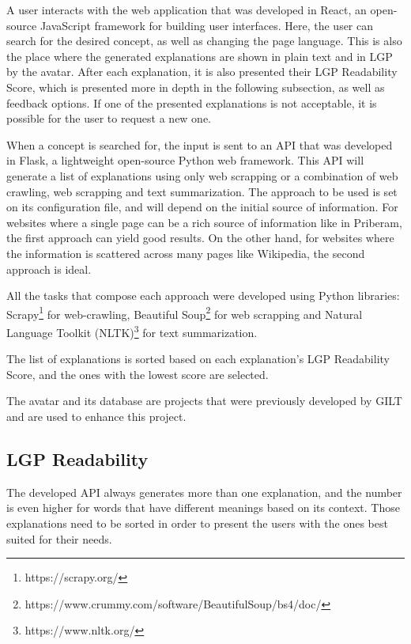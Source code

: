 \documentclass[runningheads]{llncs}
\begin{document}
A user interacts with the web application that was developed in React\cite{react}, an open-source JavaScript framework for building user interfaces.
Here, the user can search for the desired concept, as well as changing the page language.
This is also the place where the generated explanations are shown in plain text and in LGP by the avatar.
After each explanation, it is also presented their LGP Readability Score, which is presented more in depth in the following subsection, as well as feedback options.
If one of the presented explanations is not acceptable, it is possible for the user to request a new one.

When a concept is searched for, the input is sent to an API that was developed in Flask\cite{flask}, a lightweight open-source Python web framework.
This API will generate a list of explanations using only web scrapping or a combination of web crawling, web scrapping and text summarization.
The approach to be used is set on its configuration file, and will depend on the initial source of information.
For websites where a single page can be a rich source of information like in Priberam\cite{priberam}, the first approach can yield good results.
On the other hand, for websites where the information is scattered across many pages like Wikipedia\cite{wikipedia}, the second approach is ideal.

All the tasks that compose each approach were developed using Python libraries: Scrapy\footnote{https://scrapy.org/} for web-crawling, Beautiful Soup\footnote{https://www.crummy.com/software/BeautifulSoup/bs4/doc/} for web scrapping and Natural Language Toolkit (NLTK)\footnote{https://www.nltk.org/} for text summarization.

The list of explanations is sorted based on each explanation's LGP Readability Score, and the ones with the lowest score are selected.

The avatar and its database are projects that were previously developed by GILT and are used to enhance this project.

\subsection{LGP Readability}

The developed API always generates more than one explanation, and the number is even higher for words that have different meanings based on its context.
Those explanations need to be sorted in order to present the users with the ones best suited for their needs.
\end{document}
